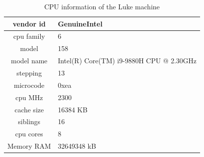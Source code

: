 \documentclass[
10pt, %
a4paper, %
oneside, %
headinclude,footinclude, %
BCOR5mm, %
]{scrartcl}
\begin{document}
\begin{table}[!ht]
\centering
\begin{tabular}{|c|p{7cm}|}
\hline
vendor id       & GenuineIntel \\\hline
cpu family      & 6 \\\hline
model           & 158 \\\hline
model name      & Intel(R) Core(TM) i9-9880H CPU @ 2.30GHz \\\hline
stepping        & 13 \\\hline
microcode       & 0xea \\\hline
cpu MHz         & 2300 \\\hline
cache size      & 16384 KB \\\hline
siblings        & 16 \\\hline
cpu cores       & 8 \\\hline\hline
Memory RAM      & 32649348 kB\\\hline
\end{tabular}
\caption{CPU information of the Luke machine}\label{cpu:luke}
\end{table}


\pagebreak
\renewcommand{\refname}{\spacedlowsmallcaps{References}} %

\end{document}

